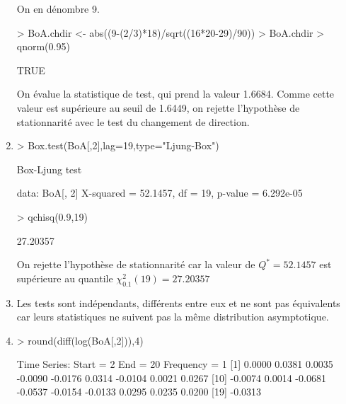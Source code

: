 \documentclass{article}
\begin{document}
\begin{enumerate}
On en dénombre 9.

\begin{Schunk}
\begin{Sinput}
> BoA.chdir <- abs((9-(2/3)*18)/sqrt((16*20-29)/90))
> BoA.chdir > qnorm(0.95)
\end{Sinput}
\begin{Soutput}
[1] TRUE
\end{Soutput}
\end{Schunk}
On évalue la statistique de test, qui prend la valeur 1.6684. Comme cette valeur est supérieure au seuil de 1.6449, on rejette l'hypothèse de stationnarité avec le test du changement de direction.
\item
\begin{Schunk}
\begin{Sinput}
> Box.test(BoA[,2],lag=19,type="Ljung-Box")
\end{Sinput}
\begin{Soutput}
	Box-Ljung test

data:  BoA[, 2] 
X-squared = 52.1457, df = 19, p-value = 6.292e-05
\end{Soutput}
\begin{Sinput}
> qchisq(0.9,19)
\end{Sinput}
\begin{Soutput}
[1] 27.20357
\end{Soutput}
\end{Schunk}

On rejette l'hypothèse de stationnarité car la valeur de $Q^{*}=52.1457$ est supérieure au quantile $\chi^2_{0.1}(19) = 27.20357$
  
\item
  Les tests sont indépendants, différents entre eux et ne sont pas équivalents 
  car leurs statistiques ne suivent pas la même distribution asymptotique.
  
\item
\begin{Schunk}
\begin{Sinput}
> round(diff(log(BoA[,2])),4)
\end{Sinput}
\begin{Soutput}
Time Series:
Start = 2 
End = 20 
Frequency = 1 
 [1]  0.0000  0.0381  0.0035 -0.0090 -0.0176  0.0314 -0.0104  0.0021  0.0267
[10] -0.0074  0.0014 -0.0681 -0.0537 -0.0154 -0.0133  0.0295  0.0235  0.0200
[19] -0.0313
\end{Soutput}
\end{Schunk}


\end{enumerate}
\end{document}

